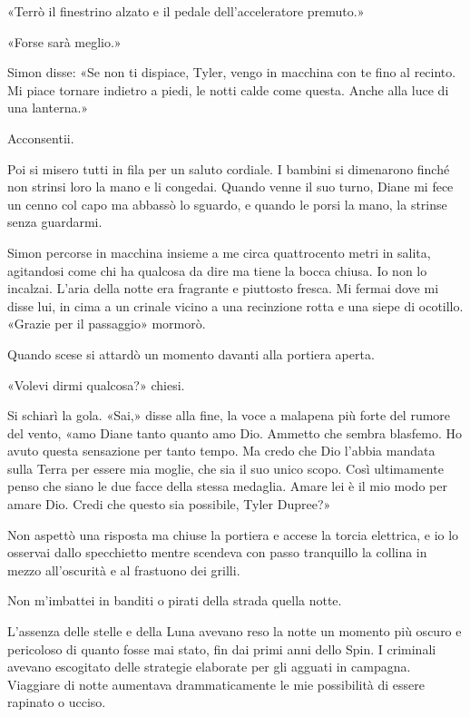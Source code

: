 «Terrò il finestrino alzato e il pedale dell'acceleratore premuto.»

«Forse sarà meglio.»

Simon disse: «Se non ti dispiace, Tyler, vengo in macchina con te fino
al recinto. Mi piace tornare indietro a piedi, le notti calde come
questa. Anche alla luce di una lanterna.»

Acconsentii.

Poi si misero tutti in fila per un saluto cordiale. I bambini si
dimenarono finché non strinsi loro la mano e li congedai. Quando venne
il suo turno, Diane mi fece un cenno col capo ma abbassò lo sguardo, e
quando le porsi la mano, la strinse senza guardarmi.

\separatorefiori

Simon percorse in macchina insieme a me circa quattrocento metri in
salita, agitandosi come chi ha qualcosa da dire ma tiene la bocca
chiusa. Io non lo incalzai. L'aria della notte era fragrante e piuttosto
fresca. Mi fermai dove mi disse lui, in cima a un crinale vicino a una
recinzione rotta e una siepe di ocotillo. «Grazie per il passaggio»
mormorò.

Quando scese si attardò un momento davanti alla portiera aperta.

«Volevi dirmi qualcosa?» chiesi.

Si schiarì la gola. «Sai,» disse alla fine, la voce a malapena più forte
del rumore del vento, «amo Diane tanto quanto amo Dio. Ammetto che
sembra blasfemo. Ho avuto questa sensazione per tanto tempo. Ma credo
che Dio l'abbia mandata sulla Terra per essere mia moglie, che sia il
suo unico scopo. Così ultimamente penso che siano le due facce della
stessa medaglia. Amare lei è il mio modo per amare Dio. Credi che questo
sia possibile, Tyler Dupree?»

Non aspettò una risposta ma chiuse la portiera e accese la torcia
elettrica, e io lo osservai dallo specchietto mentre scendeva con passo
tranquillo la collina in mezzo all'oscurità e al frastuono dei grilli.

\separatorefiori

Non m'imbattei in banditi o pirati della strada quella notte.

L'assenza delle stelle e della Luna avevano reso la notte un momento più
oscuro e pericoloso di quanto fosse mai stato, fin dai primi anni dello
Spin. I criminali avevano escogitato delle strategie elaborate per gli
agguati in campagna. Viaggiare di notte aumentava drammaticamente le mie
possibilità di essere rapinato o ucciso.

